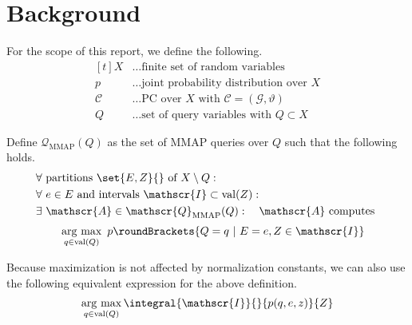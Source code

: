 \documentclass[9pt,fleqn,twoside,twocolumn]{stdglobal}
\DeclareMathOperator*{\argmax}{arg\ max}
\DeclareMathOperator{\val}{val}
\begin{document}
\section{Background}
  For the scope of this report, we define the following.
  \[
    \begin{aligned}[t]
      X &\ldots \text{finite set of random variables} \\
      p\, &\ldots \text{joint probability distribution over $X$} \\
      \mathscr{C}\, &\ldots \text{PC over $X$ with $\mathscr{C}=(\mathscr{G},ϑ)$} \\
      Q &\ldots \text{set of query variables with $Q\subset X$}
    \end{aligned}
  \]
  \begin{definition*}
    Define $\mathscr{Q}_\mathrm{MMAP}(Q)$ as the set of MMAP queries over $Q$ such that the following holds.
    \[
      \begin{aligned}
        &\forall\ \text{partitions } \set{E,Z}{} \text{ of } X\setminus Q: \\
        &\forall\ e\in E \text{ and intervals } \mathscr{I}\subset\val(Z): \\
        &\exists\ \mathscr{A}\in \mathscr{Q}_\mathrm{MMAP}(Q):\quad \mathscr{A} \text{ computes } \\
      \end{aligned}
    \]
    \[
      \quad\argmax_{q\in \val(Q)}\ p\roundBrackets{Q = q \ |\ E = e, Z\in \mathscr{I}}
    \]
  \end{definition*}
  Because maximization is not affected by normalization constants, we can also use the following equivalent expression for the above definition.
  \[
    \argmax_{q\in \val(Q)} \integral{\mathscr{I}}{}{p(q,e,z)}{Z}
  \]
\end{document}
